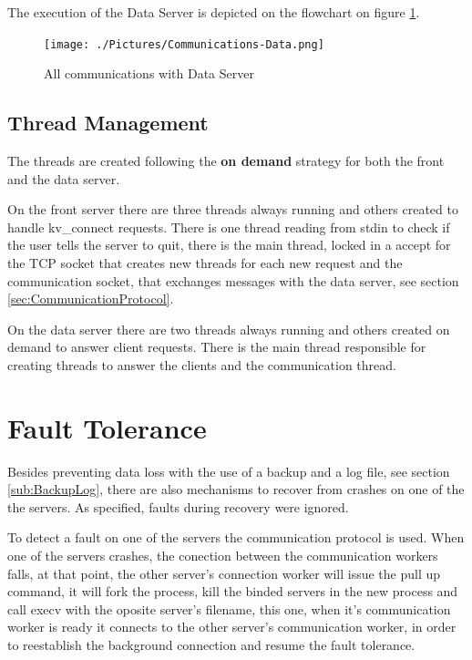 \documentclass[12pt]{article} %
\begin{document}
The execution of the Data Server is depicted on the flowchart on figure \ref{fig:CommunicationsData}.

\begin{figure}[ht]
\centering
\texttt{[image: ./Pictures/Communications-Data.png]}
\caption{All communications with Data Server}\label{fig:CommunicationsData}
\end{figure}

\subsection{Thread Management}
\label{sub:ThreadManagement}

The threads are created following the \textbf{on demand} strategy for both the front and
the data server.

On the front server there are three threads always running and others created
to handle kv\_connect requests. There is one thread reading from stdin to check if
the user tells the server to quit, there is the main thread, locked in a accept for the
TCP socket that creates new threads for each new request and the communication
socket, that exchanges messages with the data server, see section \ref{sec:CommunicationProtocol}.

On the data server there are two threads always running and others created
on demand to answer client requests. There is the main thread responsible for
creating threads to answer the clients and the communication thread.

\section{Fault Tolerance}
\label{sec:FaultTolerance}

Besides preventing data loss with the use of a backup and a log file, see section \ref{sub:BackupLog},
there are also mechanisms to recover from crashes on one of the the servers.
As specified, faults during recovery were ignored.

To detect a fault on one of the servers the communication protocol is used.
When one of the servers crashes, the conection between the communication
workers falls, at that point, the other server's connection worker will issue the pull
up command, it will fork the process, kill the binded servers in the new process and
call execv with the oposite server's filename, this one, when it's communication
worker is ready it connects to the other server's communication worker, in order
to reestablish the background connection and resume the fault tolerance.

\end{document}
